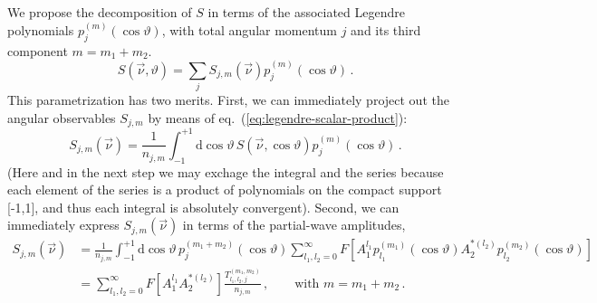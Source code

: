 \documentclass[aps,prd,reprint,nofootinbib,preprintnumbers]{revtex4}
\newcommand{\rmdx}[1]{\mbox{d} #1 \,} %
\newcommand{\refeq}[1]{eq.~(\ref{eq:#1})}
\renewcommand{\theta}{\vartheta}
\begin{document}
We propose the decomposition of $S$ in terms of the associated Legendre polynomials $p_{j}^{(m)}(\cos\theta)$, with total angular momentum $j$ and its third component $m=m_1 + m_2$.
\begin{equation}
    S(\vec{\nu}, \theta) = \sum_j S_{j,m}(\vec{\nu}) p_{j}^{(m)}(\cos\theta)\,.
\end{equation}
This parametrization has two merits. First, we can immediately project out the angular observables $S_{j,m}$ by means of \refeq{legendre-scalar-product}:
\begin{equation}
    S_{j,m}(\vec{\nu}) = \frac{1}{n_{j,m}} \int_{-1}^{+1} \rmdx{\cos\theta} S(\vec{\nu},\cos \theta) p_{j}^{(m)}(\cos\theta)\,.
\end{equation}
(Here and in the next step we may exchage the integral and the
series because each element of the series is a product of
polynomials on the compact support [-1,1], and thus each integral
is absolutely convergent).
Second, we can immediately express $S_{j,m}(\vec{\nu})$ in terms of
the partial-wave amplitudes,
\begin{equation}
    \label{eq:partial-wave-observable-infinite}
    \begin{aligned}
        S_{j,m}(\vec{\nu})
            & = \frac{1}{n_{j,m}} \int_{-1}^{+1} \rmdx{\cos\theta} p_{j}^{(m_1 + m_2)}(\cos\theta) \sum_{l_1,l_2=0}^\infty F\left[A_{1}^{l_1} p_{l_1}^{(m_1)}(\cos\theta) A_{2}^{*(l_2)}p_{l_2}^{(m_2)}(\cos\theta)\right]\\
            & = \sum_{l_1,l_2=0}^\infty F\left[A_{1}^{l_1} A_{2}^{*(l_2)}\right] \frac{T_{l_1,l_2,j}^{(m_1,m_2)}}{n_{j,m}}\,,\qquad\text{with }m = m_1 + m_2\,.
    \end{aligned}
\end{equation}
\end{document}
